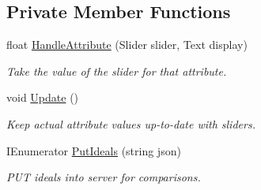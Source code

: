 \subsection*{Private Member Functions}
\begin{DoxyCompactItemize}
\item 
float \mbox{\hyperlink{class_personality_creation_a60f9fca99fc7cf87fe6db7778684776e}{Handle\+Attribute}} (Slider slider, Text display)
\begin{DoxyCompactList}\small\item\em Take the value of the slider for that attribute. \end{DoxyCompactList}\item 
void \mbox{\hyperlink{class_personality_creation_a42a823afe83e0b59d3c4119a9a58574c}{Update}} ()
\begin{DoxyCompactList}\small\item\em Keep actual attribute values up-\/to-\/date with sliders. \end{DoxyCompactList}\item 
I\+Enumerator \mbox{\hyperlink{class_personality_creation_aa8e27efd53fd6cbc698c84a863fbcafa}{Put\+Ideals}} (string json)
\begin{DoxyCompactList}\small\item\em P\+UT ideals into server for comparisons. \end{DoxyCompactList}\end{DoxyCompactItemize}

